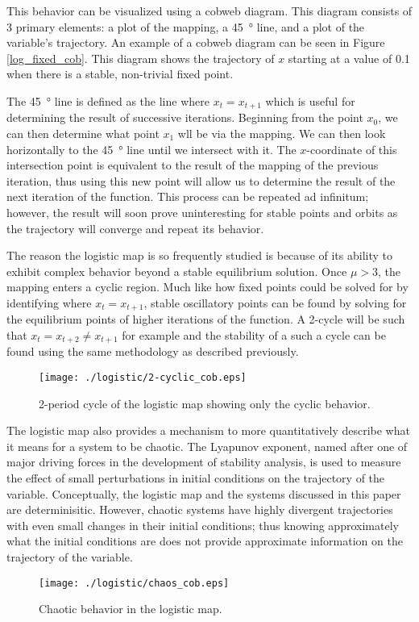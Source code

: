 This behavior can be visualized using a cobweb diagram. This diagram consists of 3 primary elements: a plot of the mapping, a \SI{45}{\degree} line, and a plot of the variable's trajectory. An example of a cobweb diagram can be seen in Figure \ref{log_fixed_cob}. This diagram shows the trajectory of $x$ starting at a value of 0.1 when there is a stable, non-trivial fixed point.

The \SI{45}{\degree} line is defined as the line where $x_t=x_{t+1}$ which is useful for determining the result of successive iterations. Beginning from the point $x_0$, we can then determine what point $x_1$ wll be via the mapping. We can then look horizontally to the \SI{45}{\degree} line until we intersect with it. The $x$-coordinate of this intersection point is equivalent to the result of the mapping of the previous iteration, thus using this new point will allow us to determine the result of the next iteration of the function. This process can be repeated ad infinitum; however, the result will soon prove uninteresting for stable points and orbits as the trajectory will converge and repeat its behavior.

The reason the logistic map is so frequently studied is because of its ability to exhibit complex behavior beyond a stable equilibrium solution. Once $\mu>3$, the mapping enters a cyclic region. Much like how fixed points could be solved for by identifying where $x_{t}=x_{t+1}$, stable oscillatory points can be found by solving for the equilibrium points of higher iterations of the function. A 2-cycle will be such that $x_{t}=x_{t+2}\neq x_{t+1}$ for example and the stability of a such a cycle can be found using the same methodology as described previously. 
\begin{figure}
    \centering
    \texttt{[image: ./logistic/2-cyclic\_cob.eps]}
    \caption{2-period cycle of the logistic map showing only the cyclic behavior.}
    \label{log_cyclic_cob}
\end{figure}
The logistic map also provides a mechanism to more quantitatively describe what it means for a system to be chaotic. The Lyapunov exponent, named after one of major driving forces in the development of stability analysis, is used to measure the effect of small perturbations in initial conditions on the trajectory of the variable\autocite{Puu2003}. Conceptually, the logistic map and the systems discussed in this paper are determinisitic. However, chaotic systems have highly divergent trajectories with even small changes in their initial conditions; thus knowing approximately what the initial conditions are does not provide approximate information on the trajectory of the variable. 
\begin{figure}
    \centering
    \texttt{[image: ./logistic/chaos\_cob.eps]}
    \caption{Chaotic behavior in the logistic map.}
    \label{log_chaos_cob}
\end{figure}

